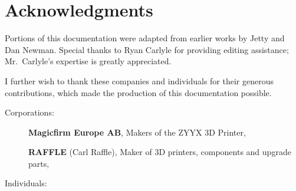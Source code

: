 
\chapter{Acknowledgments}


Portions of this documentation were adapted from earlier works by Jetty and Dan Newman.  Special thanks to Ryan Carlyle for providing editing assistance; Mr.~Carlyle's expertise is greatly appreciated.

I further wish to thank these companies and individuals for their generous
contributions, which made the production of this documentation possible.

\noindent Corporations:

\begin{description}
\item[] \textbf{Magicfirm Europe AB}, Makers of the ZYYX 3D Printer,
\ifpdf\newline\fi
{}
\item[] \textbf{RAFFLE} (Carl Raffle), Maker of 3D printers, components and upgrade parts, 
\end{description}

\noindent Individuals:

